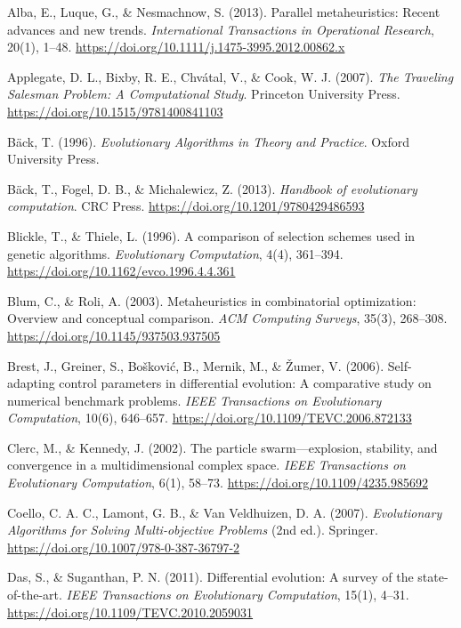\documentclass[conference]{IEEEtran}
\begin{document}
\begin{thebibliography}{99}

Alba, E., Luque, G., \& Nesmachnow, S. (2013). Parallel metaheuristics: Recent advances and new trends. \textit{International Transactions in Operational Research}, 20(1), 1–48. \url{https://doi.org/10.1111/j.1475-3995.2012.00862.x}

Applegate, D. L., Bixby, R. E., Chvátal, V., \& Cook, W. J. (2007). \textit{The Traveling Salesman Problem: A Computational Study}. Princeton University Press. \url{https://doi.org/10.1515/9781400841103}

Bäck, T. (1996). \textit{Evolutionary Algorithms in Theory and Practice}. Oxford University Press.

Bäck, T., Fogel, D. B., \& Michalewicz, Z. (2013). \textit{Handbook of evolutionary computation}. CRC Press. \url{https://doi.org/10.1201/9780429486593}

Blickle, T., \& Thiele, L. (1996). A comparison of selection schemes used in genetic algorithms. \textit{Evolutionary Computation}, 4(4), 361–394. \url{https://doi.org/10.1162/evco.1996.4.4.361}

Blum, C., \& Roli, A. (2003). Metaheuristics in combinatorial optimization: Overview and conceptual comparison. \textit{ACM Computing Surveys}, 35(3), 268–308. \url{https://doi.org/10.1145/937503.937505}

Brest, J., Greiner, S., Bošković, B., Mernik, M., \& Žumer, V. (2006). Self-adapting control parameters in differential evolution: A comparative study on numerical benchmark problems. \textit{IEEE Transactions on Evolutionary Computation}, 10(6), 646–657. \url{https://doi.org/10.1109/TEVC.2006.872133}

Clerc, M., \& Kennedy, J. (2002). The particle swarm—explosion, stability, and convergence in a multidimensional complex space. \textit{IEEE Transactions on Evolutionary Computation}, 6(1), 58–73. \url{https://doi.org/10.1109/4235.985692}

Coello, C. A. C., Lamont, G. B., \& Van Veldhuizen, D. A. (2007). \textit{Evolutionary Algorithms for Solving Multi-objective Problems} (2nd ed.). Springer. \url{https://doi.org/10.1007/978-0-387-36797-2}

Das, S., \& Suganthan, P. N. (2011). Differential evolution: A survey of the state-of-the-art. \textit{IEEE Transactions on Evolutionary Computation}, 15(1), 4–31. \url{https://doi.org/10.1109/TEVC.2010.2059031}


\end{thebibliography}
\end{document}
